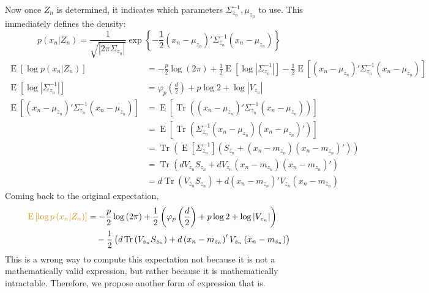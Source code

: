 \documentclass[11pt]{article}
\DeclareMathOperator{\Tr}{Tr}
\newcommand{\opn}{\operatorname}
\begin{document}
Now once $Z_{n}$ is determined, it indicates which parameters $\Sigma_{z_{n}}^{-1}, \mu_{z_{n}}$ to use. This immediately defines the density:
$$
  p \left(x_{n}|Z_{n}\right) = \frac{1}{\sqrt{\left|2\pi \Sigma_{z_{n}} \right|}} \exp \left\{-\frac{1}{2} \left(x_{n}-\mu_{z_{n}} \right)'\Sigma_{z_{n}}^{-1}\left(x_{n}-\mu_{z_{n}} \right) \right\}
$$
\begin{align*}
  \opn{E}\left[\log p \left(x_{n}|Z_{n}\right) \right] &= -\frac{p}{2}\log \left(2\pi \right) + \frac{1}{2}\opn{E}\left[\log \left|\Sigma_{z_{n}}^{-1}\right| \right]-\frac{1}{2}\opn{E}\left[\left(x_{n}-\mu_{z_{n}}\right)'\Sigma_{z_{n}}^{-1}\left(x_{n}-\mu_{z_{n}} \right) \right]\\
  \opn{E}\left[\log \left|\Sigma_{z_{n}}^{-1} \right| \right] &= \varphi_{p}\left(\frac{d}{2}\right) + p \log 2 + \log \left|V_{z_{n}} \right| \\
  \opn{E}\left[\left(x_{n}-\mu_{z_{n}}\right)'\Sigma_{z_{n}}^{-1}\left(x_{n}-\mu_{z_{n}} \right) \right] &= \opn{E}\left[\Tr \left(\left(x_{n}-\mu_{z_{n}} \right)'\Sigma_{z_{n}}^{-1}\left(x_{n} - \mu_{z_{n}} \right) \right) \right] \\
  &= \opn{E}\left[\Tr \left(\Sigma_{z_{n}}^{-1}\left(x_{n}-\mu_{z_{n}} \right)\left(x_{n}-\mu_{z_{n}} \right)' \right) \right]\\
  &= \Tr \left(\opn{E}\left[\Sigma_{z_{n}}^{-1} \right]\left(S_{z_{n}} + \left(x_{n}-m_{z_{n}} \right)\left(x_{n}-m_{z_{n}} \right)' \right) \right)\\
  &= \Tr \left(dV_{z_{n}}S_{z_{n}} + dV_{z_{n}}\left(x_{n}-m_{z_{n}} \right)\left(x_{n}-m_{z_{n}} \right)' \right)\\
  &= d\Tr \left(V_{z_{n}}S_{z_{n}} \right) + d \left(x_{n}-m_{z_{n}} \right)'V_{z_{n}}\left(x_{n}-m_{z_{n}} \right)
\end{align*}
Coming back to the original expectation,
\begin{align*}
  \textcolor{myorange}{\opn{E}\left[\log p \left(x_{n}|Z_{n}\right) \right]} &= -\frac{p}{2}\log \left(2\pi \right) + \frac{1}{2}\left(\varphi_{p}\left(\frac{d}{2}\right) + p \log 2 + \log \left|V_{z_{n}} \right| \right)\\
  & \quad - \frac{1}{2} \left(d\Tr \left(V_{z_{n}}S_{z_{n}} \right) + d \left(x_{n}-m_{z_{n}} \right)'V_{z_{n}}\left(x_{n}-m_{z_{n}} \right) \right)
\end{align*}
This is a wrong way to compute this expectation not because it is not a mathematically valid expression, but rather because it is mathematically intractable. Therefore, we propose another form of expression that is.\par
\end{document}
